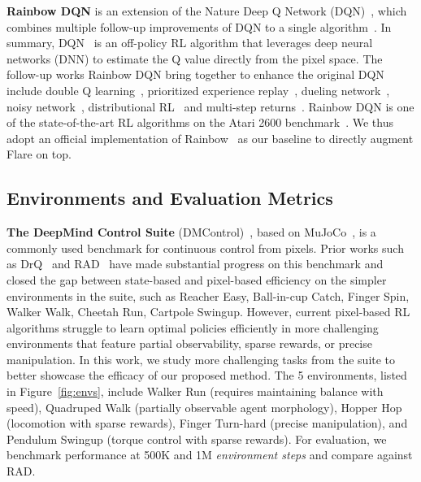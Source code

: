\documentclass{article} \usepackage{iclr2021_conference,times}
\begin{document}
\textbf{Rainbow DQN} is an extension of the Nature Deep Q Network (DQN)~\citep{mnih2015human}, which combines multiple follow-up improvements of DQN to a single algorithm~\citep{hessel2017rainbow}. In summary, DQN~\citep{mnih2015human} is an off-policy RL algorithm that leverages deep neural networks (DNN) to estimate the Q value directly from the pixel space. The follow-up works Rainbow DQN bring together to enhance the original DQN include double Q learning~\citep{hasselt2010double}, prioritized experience replay~\citep{schaul2015prioritized}, dueling network~\citep{wang2016dueling}, noisy network~\citep{fortunato2017noisy}, distributional RL~\citep{bellemare2017distributional} and multi-step returns~\citep{SuttonBook}. Rainbow DQN is one of the state-of-the-art RL algorithms on the Atari 2600 benchmark~\citep{bellemare2013arcade}. We thus adopt an official implementation of Rainbow~\citep{dqnzoo2020github} as our baseline to directly augment Flare on top.
\subsection{Environments and Evaluation Metrics}\label{sec:dmcontrol}
    \textbf{The DeepMind Control Suite} (DMControl)~\citep{tassa2018deepmind}, based on MuJoCo~\citep{mujoco}, is a commonly used benchmark for continuous control from pixels.
Prior works such as DrQ~\citep{kostrikov2020image} and RAD~\citep{laskin_lee2020rad} have made substantial progress on this benchmark and closed the gap between state-based and pixel-based efficiency on the simpler environments in the suite, such as Reacher Easy, Ball-in-cup Catch, Finger Spin, Walker Walk, Cheetah Run, Cartpole Swingup. However, current pixel-based RL algorithms struggle to learn optimal policies efficiently in more challenging environments that feature partial observability, sparse rewards, or precise manipulation. In this work, we study more challenging tasks from the suite to better showcase the efficacy of our proposed method. The 5 environments, listed in Figure~\ref{fig:envs}, include Walker Run (requires maintaining balance with speed), Quadruped Walk (partially observable agent morphology), Hopper Hop (locomotion with sparse rewards), Finger Turn-hard (precise manipulation), and Pendulum Swingup (torque control with sparse rewards). For evaluation, we benchmark performance at 500K and 1M \emph{environment steps} and compare against RAD.
    
\end{document}
